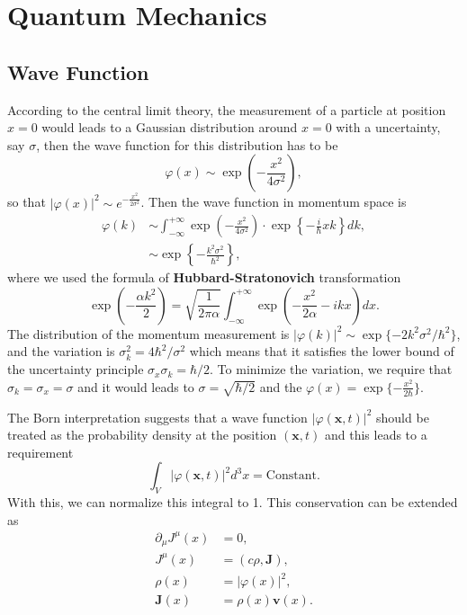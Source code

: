 \section{Quantum Mechanics}

\subsection{Wave Function}

According to the central limit theory, the measurement of a particle at position $x=0$ would leads to a Gaussian distribution around $x=0$ with a uncertainty, say $\sigma$, then the wave function for this distribution has to be 
\begin{equation}
\varphi(x)\sim \exp\left(-\frac{x^2}{4\sigma^2}\right),
\end{equation}
so that $|\varphi(x)|^2\sim e^{-\frac{x^2}{2\sigma^2}}$. Then the wave function in momentum space is
\begin{equation}
\begin{aligned}
\varphi(k)&\sim\int_{-\infty}^{+\infty}\exp\left(-\frac{x^2}{4\sigma^2}\right)\cdot\exp\left\{-\frac{i}{\hbar}xk\right\}dk,\\
&\sim \exp\left\{-\frac{k^2\sigma^2}{\hbar^2}\right\},
\end{aligned}
\end{equation}
where we used the formula of \textbf{Hubbard-Stratonovich} transformation
\begin{equation}
\exp\left(-\frac{\alpha k^2}{2}\right)=\sqrt{\frac{1}{2\pi\alpha}}\int_{-\infty}^{+\infty}\exp\left(-\frac{x^2}{2\alpha}-ikx\right)dx.
\end{equation}
The distribution of the momentum measurement is $|\varphi(k)|^2\sim \exp\{-2k^2\sigma^2/\hbar^2\}$, and the variation is $\sigma_k^2= 4\hbar^2/\sigma^2$ which means that it satisfies the lower bound of the uncertainty principle $\sigma_x\sigma_k=\hbar/2$. To minimize the variation, we require that $\sigma_k=\sigma_x=\sigma$ and it would leads to $\sigma=\sqrt{\hbar/2}$ and the $\varphi(x)=\exp\{-\frac{x^2}{2\hbar}\}$.


The Born interpretation suggests that a wave function $|\varphi(\boldsymbol{x},t)|^2$ should be treated as the probability density at the position $(\boldsymbol{x},t)$ and this leads to a requirement
\begin{equation}
\int_V |\varphi(\boldsymbol{x},t)|^2d^3x=\text{Constant}.
\end{equation}
With this, we can normalize this integral to 1. This conservation can be extended as
\begin{equation}
\begin{aligned}
\partial_\mu J^\mu(x) &= 0,\\ 
J^\mu(x) &= (c\rho,\boldsymbol{J}),\\
\rho(x)&=|\varphi(x)|^2,\\
\boldsymbol{J}(x)&=\rho(x)\boldsymbol{v}(x).
\end{aligned}
\end{equation}


